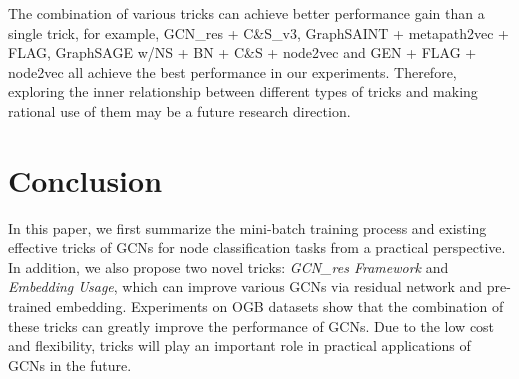\documentclass[runningheads]{llncs}
\begin{document}
The combination of various tricks can achieve better performance gain
than a single trick, for example, GCN\_res + C\&S\_v3, GraphSAINT + metapath2vec + FLAG, GraphSAGE w/NS + BN + C\&S + node2vec and GEN + FLAG + node2vec all
achieve the best performance in our experiments. Therefore, exploring the inner relationship
between different types of tricks and making rational use of them may be
a future research direction.

\section{Conclusion}\label{conclusion}

In this paper, we first summarize the mini-batch training process and existing effective tricks of GCNs for node classification tasks from a practical perspective. In addition, we also propose
two novel tricks: \textsl{GCN\_res Framework} and \textsl{Embedding Usage}, which can improve various GCNs via residual network and pre-trained embedding. Experiments
on OGB datasets show that the combination of these tricks can
greatly improve the performance of GCNs. Due to the low cost and
flexibility, tricks will play an important role in practical
applications of GCNs in the future.





















\newpage



\end{document}
